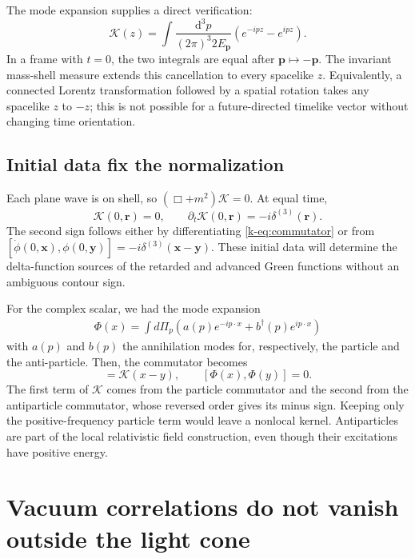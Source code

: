 \documentclass[11pt]{article}
\newcommand{\dd}{\mathrm{d}}
\begin{document}
The mode expansion supplies a direct verification:
\begin{equation}
 \mathcal K(z)=\int\frac{\dd^3p}{(2\pi)^3 2E_{\bm p}}
 (e^{-ipz}-e^{ipz}).
 \label{k-eq:commutator}
\end{equation}
In a frame with \(t=0\), the two integrals are equal after
\(\bm p\mapsto-\bm p\). The invariant mass-shell measure extends this
cancellation to every spacelike \(z\). Equivalently, a connected Lorentz
transformation followed by a spatial rotation takes any spacelike
\(z\) to \(-z\); this is not possible for a future-directed timelike
vector without changing time orientation.

\subsection{Initial data fix the normalization}
Each plane wave is on shell, so
\((\Box+m^2)\mathcal K=0\). At equal time,
\begin{equation}
 \mathcal K(0,\bm r)=0,\qquad
 \partial_t\mathcal K(0,\bm r)=-i\delta^{(3)}(\bm r).
 \label{k-eq:initialdata}
\end{equation}
The second sign follows either by differentiating \eqref{k-eq:commutator}
or from \([\dot\phi(0,\bm x),\phi(0,\bm y)]=-i\delta^{(3)}(\bm x-\bm y)\).
These initial data will determine the delta-function sources of the
retarded and advanced Green functions without an ambiguous contour sign.

For the complex scalar, we had the mode expansion
\begin{align}
	\Phi(x)=\int d\Pi_p(a(p)e^{-i p\cdot x}+b^\dagger(p) e^{i p\cdot x})
\end{align}
with $a(p)$ and $b(p)$ the annihilation modes for, respectively, the particle and the anti-particle.
Then, the commutator becomes
\begin{equation}
 [\Phi(x),\Phi^\dagger(y)]=\mathcal K(x-y),\qquad
 [\Phi(x),\Phi(y)]=0.
 \label{k-eq:complexcomm}
\end{equation}
The first term of \(\mathcal K\) comes from the particle commutator and the
second from the antiparticle commutator, whose reversed order gives its
minus sign. Keeping only the positive-frequency particle term would
leave a nonlocal kernel. Antiparticles are part of the local relativistic
field construction, even though their excitations have positive energy.

\section{Vacuum correlations do not vanish outside the light cone}
\end{document}
